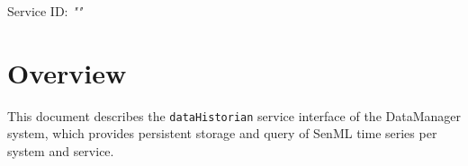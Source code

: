 \documentclass[a4paper]{arrowhead}
\begin{document}
\sloppy

\ArrowheadSetup

\begin{center}
  \vspace*{1cm}
  \huge{\arrowtitle}

  \vspace*{0.2cm}
  \LARGE{\arrowtype}
  \vspace*{1cm}

  \Large{Service ID: \textit{"\arrowid"}}

  \vspace*{\fill}


  \vspace*{1cm}
  \vspace*{\fill}

  \begin{abstract}
    This document describes the HTTP/1.1 protocol with TLS payload security and JSON payload encoding variant of the \texttt{dataHistorian} service of the DataManager system.
  \end{abstract}

  \vspace*{1cm}
\end{center}

\newpage

\tableofcontents
\newpage

\section{Overview}
\label{sec:overview}

This document describes the \texttt{dataHistorian} service interface of the DataManager system, which provides persistent storage and query of SenML time series per system and service.
\end{document}
